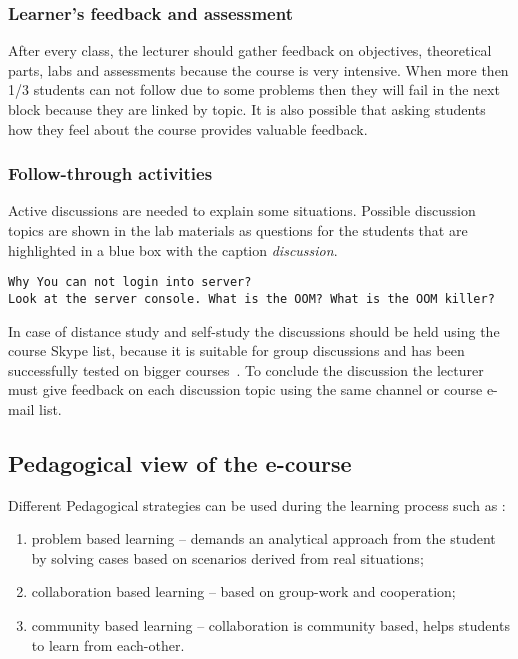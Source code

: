 \subsubsection{Learner's feedback and assessment}
After every class, the lecturer should gather feedback on objectives, theoretical parts, labs and assessments because the course is very intensive. When more then 1/3 students can not follow due to some problems then they will fail in the next block because they are linked by topic.
It is also possible that asking students how they feel about the course provides valuable feedback.

\subsubsection{Follow-through activities}
Active discussions are needed to explain some situations. Possible discussion topics are shown in the lab materials as questions for the students that are highlighted in a blue box with the caption \emph{discussion}. 

\begin{Verbatim}[frame=single,
label=Discussion,framesep=2mm,rulecolor=\color{blue},commandchars=\\\{\}]
Why You can not login into server?
Look at the server console. What is the OOM? What is the OOM killer?
\end{Verbatim}

In case of distance study and self-study the discussions should be held using the course Skype list, because it is suitable for group discussions and has been  successfully tested on bigger courses~\citep{website:kakk_teistmoodi_e}. To conclude the discussion the lecturer must give feedback on each discussion topic using the same channel or course e-mail list.


\subsection{Pedagogical view of the e-course}
Different Pedagogical strategies can be used during the learning process such as \citep{OppeArenduskeskus2010}:

\begin{enumerate}
\item problem based learning -- demands an analytical approach from the student by solving cases based on scenarios derived from real situations;
\item collaboration based learning -- based on group-work and cooperation;
\item community based learning -- collaboration is community based, helps students to learn from each-other.
\end{enumerate}

